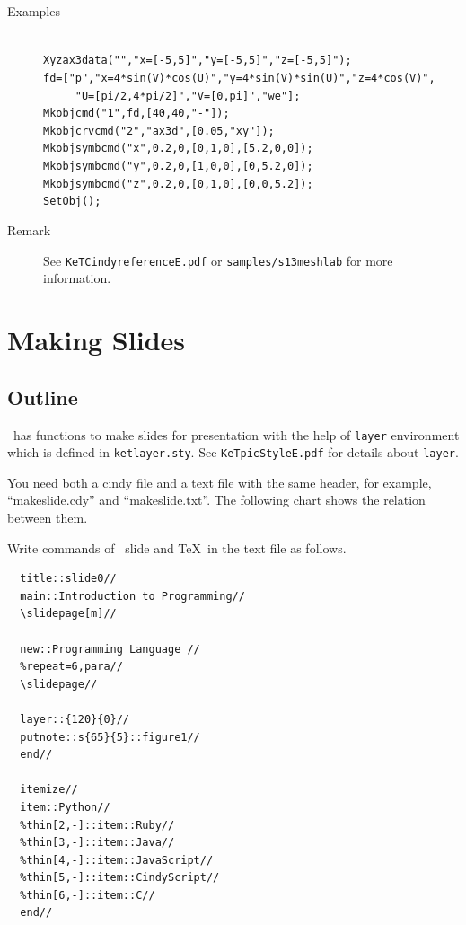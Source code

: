 \documentclass[papersize,a4paper,12pt]{article}
\begin{document}
\begin{description}
\item[Examples]\mbox{}\\
\verb|Xyzax3data("","x=[-5,5]","y=[-5,5]","z=[-5,5]");|\\
\verb|fd=["p","x=4*sin(V)*cos(U)","y=4*sin(V)*sin(U)","z=4*cos(V)",|\\
\verb|     "U=[pi/2,4*pi/2]","V=[0,pi]","we"];|\\
\verb|Mkobjcmd("1",fd,[40,40,"-"]);|\\
\verb|Mkobjcrvcmd("2","ax3d",[0.05,"xy"]);|\\
\verb|Mkobjsymbcmd("x",0.2,0,[0,1,0],[5.2,0,0]);|\\
\verb|Mkobjsymbcmd("y",0.2,0,[1,0,0],[0,5.2,0]);|\\
\verb|Mkobjsymbcmd("z",0.2,0,[0,1,0],[0,0,5.2]);|\\
\verb|SetObj();|
\item[Remark]See \verb|KeTCindyreferenceE.pdf| or \verb|samples/s13meshlab| for more information.
\end{description}


\newpage

\section{Making Slides}

\subsection{Outline}

\ketcindy\ has functions to make slides for presentation with the help of \verb|layer| environment which is defined in \verb|ketlayer.sty|.
See \verb|KeTpicStyleE.pdf| for details about \verb|layer|.

You need both a cindy file and a text file with the same header, for example, ``makeslide.cdy'' and ``makeslide.txt''. The following chart shows the relation between them.

\begin{center}

\end{center}

Write commands of \ketcindy\ slide and \TeX\ in the text file as follows.

\begin{verbatim}
  title::slide0//
  main::Introduction to Programming//
  \slidepage[m]//

  new::Programming Language //
  %repeat=6,para// 
  \slidepage// 

  layer::{120}{0}//
  putnote::s{65}{5}::figure1//
  end//

  itemize// 
  item::Python// 
  %thin[2,-]::item::Ruby// 
  %thin[3,-]::item::Java// 
  %thin[4,-]::item::JavaScript// 
  %thin[5,-]::item::CindyScript// 
  %thin[6,-]::item::C// 
  end// 
\end{verbatim}
\end{document}
